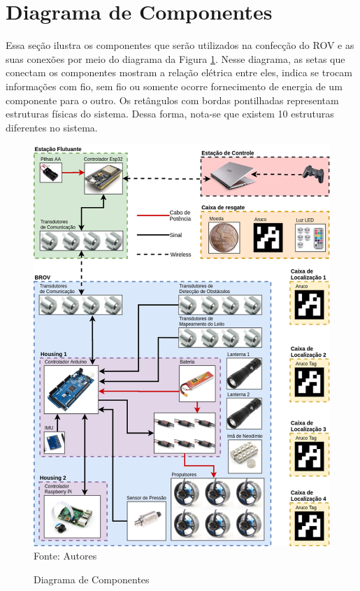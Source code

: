 \section{Diagrama de Componentes}
\label{sec:diagrama-de-componentes}

Essa seção ilustra os componentes que serão utilizados na confecção do ROV e as suas conexões por meio do diagrama da Figura \ref{fig:diagrama-de-componentes}. Nesse diagrama, as setas que conectam os componentes mostram a relação elétrica entre eles, indica se trocam informações com fio, sem fio ou somente ocorre fornecimento de energia de um componente para o outro. Os retângulos com bordas pontilhadas representam estruturas físicas do sistema. Dessa forma, nota-se que existem 10 estruturas diferentes no sistema. 

\begin{figure}[h]
	\centering
	\caption[Diagrama de Componentes]{Diagrama de Componentes}
	\label{fig:diagrama-de-componentes}
	\includegraphics[width=0.9\linewidth]{images/diagrama-de-componentes}\\
	\footnotesize Fonte: Autores
\end{figure}

